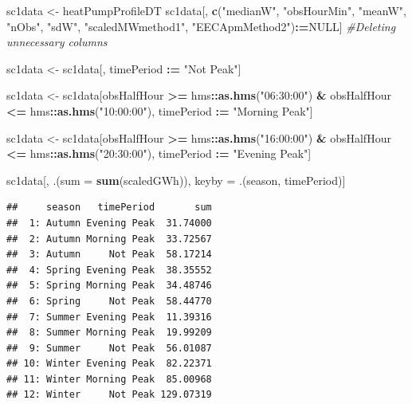 \documentclass[]{article}
\newenvironment{Shaded}{\begin{snugshade}}{\end{snugshade}}
\newcommand{\KeywordTok}[1]{\textcolor[rgb]{0.13,0.29,0.53}{\textbf{#1}}}
\newcommand{\DataTypeTok}[1]{\textcolor[rgb]{0.13,0.29,0.53}{#1}}
\newcommand{\StringTok}[1]{\textcolor[rgb]{0.31,0.60,0.02}{#1}}
\newcommand{\CommentTok}[1]{\textcolor[rgb]{0.56,0.35,0.01}{\textit{#1}}}
\newcommand{\OtherTok}[1]{\textcolor[rgb]{0.56,0.35,0.01}{#1}}
\newcommand{\OperatorTok}[1]{\textcolor[rgb]{0.81,0.36,0.00}{\textbf{#1}}}
\newcommand{\ErrorTok}[1]{\textcolor[rgb]{0.64,0.00,0.00}{\textbf{#1}}}
\newcommand{\NormalTok}[1]{#1}
\begin{document}
\begin{Shaded}
\begin{Highlighting}[]
\NormalTok{sc1data <-}\StringTok{ }\NormalTok{heatPumpProfileDT}
\NormalTok{sc1data[, }\KeywordTok{c}\NormalTok{(}\StringTok{"medianW"}\NormalTok{, }\StringTok{"obsHourMin"}\NormalTok{, }\StringTok{"meanW"}\NormalTok{, }\StringTok{"nObs"}\NormalTok{, }\StringTok{"sdW"}\NormalTok{, }\StringTok{"scaledMWmethod1"}\NormalTok{, }\StringTok{"EECApmMethod2"}\NormalTok{)}\OperatorTok{:}\ErrorTok{=}\OtherTok{NULL}\NormalTok{] }\CommentTok{#Deleting unnecessary columns}

\NormalTok{sc1data <-}\StringTok{ }\NormalTok{sc1data[, timePeriod }\OperatorTok{:}\ErrorTok{=}\StringTok{ "Not Peak"}\NormalTok{]}

\NormalTok{sc1data <-}\StringTok{ }\NormalTok{sc1data[obsHalfHour }\OperatorTok{>=}\StringTok{ }\NormalTok{hms}\OperatorTok{::}\KeywordTok{as.hms}\NormalTok{(}\StringTok{"06:30:00"}\NormalTok{) }\OperatorTok{&}\StringTok{ }
\StringTok{                     }\NormalTok{obsHalfHour }\OperatorTok{<=}\StringTok{ }\NormalTok{hms}\OperatorTok{::}\KeywordTok{as.hms}\NormalTok{(}\StringTok{"10:00:00"}\NormalTok{),}
\NormalTok{                   timePeriod }\OperatorTok{:}\ErrorTok{=}\StringTok{ "Morning Peak"}\NormalTok{]}

\NormalTok{sc1data <-}\StringTok{ }\NormalTok{sc1data[obsHalfHour }\OperatorTok{>=}\StringTok{ }\NormalTok{hms}\OperatorTok{::}\KeywordTok{as.hms}\NormalTok{(}\StringTok{"16:00:00"}\NormalTok{) }\OperatorTok{&}\StringTok{ }
\StringTok{                     }\NormalTok{obsHalfHour }\OperatorTok{<=}\StringTok{ }\NormalTok{hms}\OperatorTok{::}\KeywordTok{as.hms}\NormalTok{(}\StringTok{"20:30:00"}\NormalTok{),}
\NormalTok{                   timePeriod }\OperatorTok{:}\ErrorTok{=}\StringTok{ "Evening Peak"}\NormalTok{]}

\NormalTok{sc1data[, .(}\DataTypeTok{sum =} \KeywordTok{sum}\NormalTok{(scaledGWh)), keyby =}\StringTok{ }\NormalTok{.(season, timePeriod)]}
\end{Highlighting}
\end{Shaded}

\begin{verbatim}
##     season   timePeriod       sum
##  1: Autumn Evening Peak  31.74000
##  2: Autumn Morning Peak  33.72567
##  3: Autumn     Not Peak  58.17214
##  4: Spring Evening Peak  38.35552
##  5: Spring Morning Peak  34.48746
##  6: Spring     Not Peak  58.44770
##  7: Summer Evening Peak  11.39316
##  8: Summer Morning Peak  19.99209
##  9: Summer     Not Peak  56.01087
## 10: Winter Evening Peak  82.22371
## 11: Winter Morning Peak  85.00968
## 12: Winter     Not Peak 129.07319
\end{verbatim}
\end{document}
